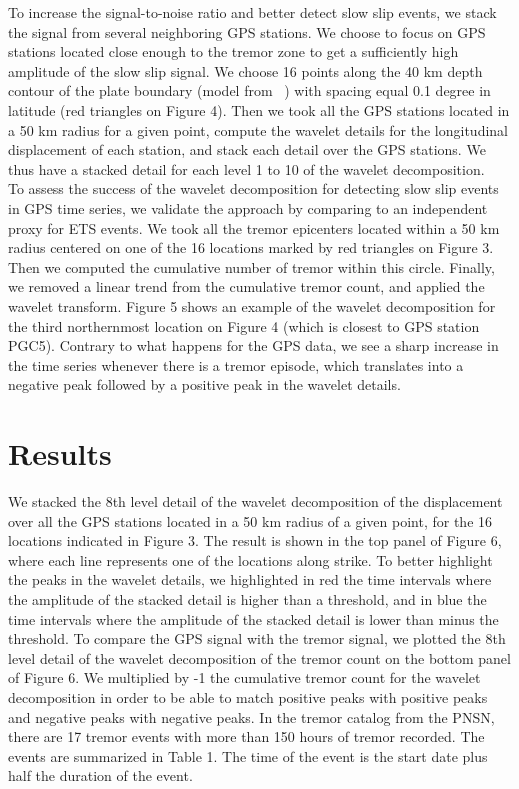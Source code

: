 \documentclass{article}
\begin{document}
To increase the signal-to-noise ratio and better detect slow slip events, we stack the signal from several neighboring GPS stations. We choose to focus on GPS stations located close enough to the tremor zone to get a sufficiently high amplitude of the slow slip signal. We choose 16 points along the 40 km depth contour of the plate boundary (model from ~\citet{PRE_2003}) with spacing equal 0.1 degree in latitude (red triangles on Figure 4). Then we took all the GPS stations located in a 50 km radius for a given point, compute the wavelet details for the longitudinal displacement of each station, and stack each detail over the GPS stations. We thus have a stacked detail for each level 1 to 10 of the wavelet decomposition. \\

To assess the success of the wavelet decomposition for detecting slow slip events in GPS time series, we validate the approach by comparing to an independent proxy for ETS events. We took all the tremor epicenters located within a 50 km radius centered on one of the 16 locations marked by red triangles on Figure 3. Then we computed the cumulative number of tremor within this circle. Finally, we removed a linear trend from the cumulative tremor count, and applied the wavelet transform. Figure 5 shows an example of the wavelet decomposition for the third northernmost location on Figure 4 (which is closest to GPS station PGC5). Contrary to what happens for the GPS data, we see a sharp increase in the time series whenever there is a tremor episode, which translates into a negative peak followed by a positive peak in the wavelet details.

\section{Results}

We stacked the 8th level detail of the wavelet decomposition of the displacement over all the GPS stations located in a 50 km radius of a given point, for the 16 locations indicated in Figure 3. The result is shown in the top panel of Figure 6, where each line represents one of the locations along strike. To better highlight the peaks in the wavelet details, we highlighted in red the time intervals where the amplitude of the stacked detail is higher than a threshold, and in blue the  time intervals where the amplitude of the stacked detail is lower than minus the threshold. To compare the GPS signal with the tremor signal, we plotted the 8th level detail of the wavelet decomposition of the tremor count on the bottom panel of Figure 6. We multiplied by -1 the cumulative tremor count for the wavelet decomposition in order to be able to match positive peaks with positive peaks and negative peaks with negative peaks. In the tremor catalog from the PNSN, there are 17 tremor events with more than 150 hours of tremor recorded. The events are summarized in Table 1. The time of the event is the start date plus half the duration of the event. \\
\end{document}
